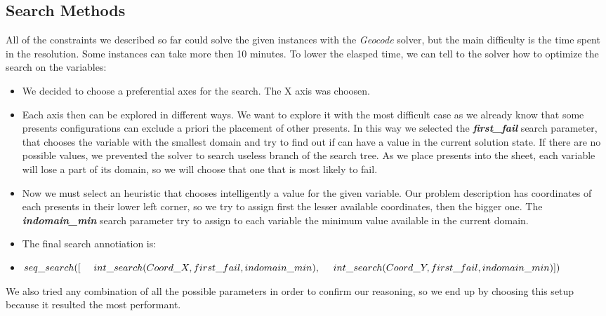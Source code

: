 \subsection{Search Methods}
All of the constraints we described so far could solve the given instances with the \textit{Geocode} solver,
but the main difficulty is the time spent in the resolution. Some instances can take more then 10 minutes.
To lower the elasped time, we can tell to the solver how to optimize the search on the variables:
\begin{itemize}
    \item We decided to choose a preferential axes for the search. The X axis was choosen.
    \item Each axis then can be explored in different ways. We want to explore it with the most difficult case
        as we already know that some presents configurations can exclude a priori the placement of other presents.
        In this way we selected the \textit{\textbf{first\_fail}} search parameter, that chooses the variable with
        the smallest domain and try to find out if can have a value in the current solution state.
        If there are no possible values, we prevented the solver to search useless branch of the search tree.
        As we place presents into the sheet, each variable will lose a part of its domain, so we will choose that
        one that is most likely to fail.
    \item Now we must select an heuristic that chooses intelligently a value for the given variable. Our problem
        description has coordinates of each presents in their lower left corner, so we try to assign first the lesser
        available coordinates, then the bigger one. The \textit{\textbf{indomain\_min}} search parameter try to assign
        to each variable the minimum value available in the current domain.
    \item The final search annotiation is:
    \item[] $seq\_search([\\
            \text{\ \ \ \ }int\_search(Coord\_X, first\_fail, indomain\_min),\\
            \text{\ \ \ \ }int\_search(Coord\_Y, first\_fail, indomain\_min)\\
        ])$
\end{itemize} 

We also tried any combination of all the possible parameters in order to confirm our reasoning, so we end up by choosing
this setup because it resulted the most performant.

